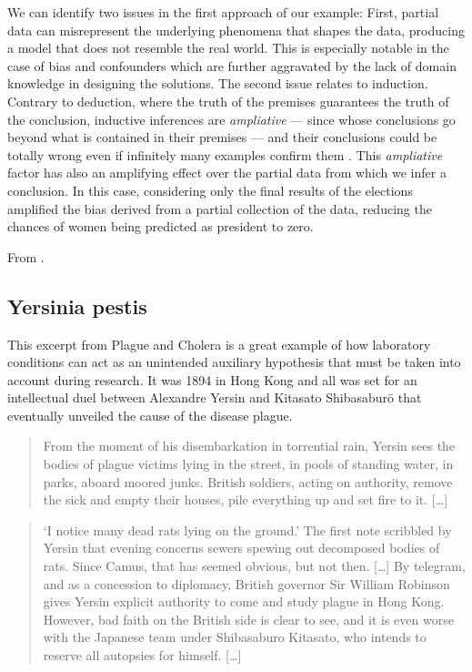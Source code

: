 \documentclass[
]{book}
\newenvironment{rnote}{\par\raggedleft}{\par}
\begin{document}
We can identify two issues in the first approach of our example: First, partial data can misrepresent the underlying phenomena that shapes the data, producing a model that does not resemble the real world. This is especially notable in the case of bias and confounders which are further aggravated by the lack of domain knowledge in designing the solutions. The second issue relates to induction. Contrary to deduction, where the truth of the premises guarantees the truth of the conclusion, inductive inferences are \emph{ampliative} --- since whose conclusions go beyond what is contained in their premises --- and their conclusions could be totally wrong even if infinitely many examples confirm them \citep{bergadano1991problem}. This \emph{ampliative} factor has also an amplifying effect over the partial data from which we infer a conclusion. In this case, considering only the final results of the elections amplified the bias derived from a partial collection of the data, reducing the chances of women being predicted as president to zero.

\begin{rnote}
From \citep{vega2021hume}.

\end{rnote}

\hypertarget{yersinia-pestis}{%
\subsection{Yersinia pestis}\label{yersinia-pestis}}

This excerpt from Plague and Cholera is a great example of how laboratory conditions can act as an unintended auxiliary hypothesis that must be taken into account during research. It was 1894 in Hong Kong and all was set for an intellectual duel between Alexandre Yersin and Kitasato Shibasaburō that eventually unveiled the cause of the disease plague.

\begin{quote}
From the moment of his disembarkation in torrential rain, Yersin sees the bodies of plague victims lying in the street, in pools of standing water, in parks, aboard moored junks. British soldiers, acting on authority, remove the sick and empty their houses, pile everything up and set fire to it. {[}\ldots{]}
\end{quote}

\begin{quote}
`I notice many dead rats lying on the ground.' The first note scribbled by Yersin that evening concerns sewers spewing out decomposed bodies of rats. Since Camus, that has seemed obvious, but not then. {[}\ldots{]} By telegram, and as a concession to diplomacy, British governor Sir William Robinson gives Yersin explicit authority to come and study plague in Hong Kong. However, bad faith on the British side is clear to see, and it is even worse with the Japanese team under Shibasaburo Kitasato, who intends to reserve all autopsies for himself. {[}\ldots{]}
\end{quote}
\end{document}
